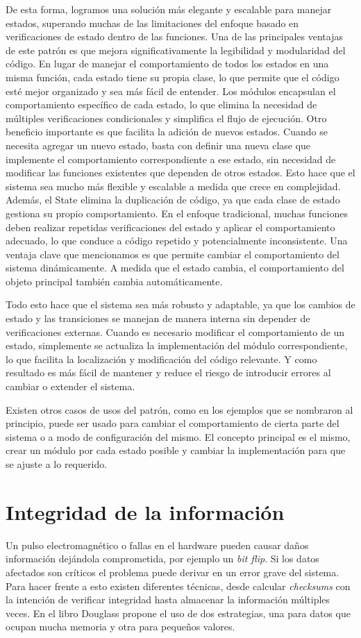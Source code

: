 De esta forma, logramos una solución más elegante y escalable para manejar estados, superando muchas de las limitaciones del enfoque basado en verificaciones de estado dentro de las funciones. Una de las principales ventajas de este patrón es que mejora significativamente la legibilidad y modularidad del código. En lugar de manejar el comportamiento de todos los estados en una misma función, cada estado tiene su propia clase, lo que permite que el código esté mejor organizado y sea más fácil de entender. Los módulos encapsulan el comportamiento específico de cada estado, lo que elimina la necesidad de múltiples verificaciones condicionales y simplifica el flujo de ejecución. Otro beneficio importante es que facilita la adición de nuevos estados. Cuando se necesita agregar un nuevo estado, basta con definir una nueva clase que implemente el comportamiento correspondiente a ese estado, sin necesidad de modificar las funciones existentes que dependen de otros estados. Esto hace que el sistema sea mucho más flexible y escalable a medida que crece en complejidad. Además, el State elimina la duplicación de código, ya que cada clase de estado gestiona su propio comportamiento. En el enfoque tradicional, muchas funciones deben realizar repetidas verificaciones del estado y aplicar el comportamiento adecuado, lo que conduce a código repetido y potencialmente inconsistente. Una ventaja clave que mencionamos es que permite cambiar el comportamiento del sistema dinámicamente. A medida que el estado cambia, el comportamiento del objeto principal también cambia automáticamente. 

Todo esto hace que el sistema sea más robusto y adaptable, ya que los cambios de estado y las transiciones se manejan de manera interna sin depender de verificaciones externas. Cuando es necesario modificar el comportamiento de un estado, simplemente se actualiza la implementación del módulo correspondiente, lo que facilita la localización y modificación del código relevante. Y como resultado es más fácil de mantener y reduce el riesgo de introducir errores al cambiar o extender el sistema.

Existen otros casos de usos del patrón, como en los ejemplos que se nombraron al principio, puede ser usado para cambiar el comportamiento de cierta parte del sistema o a modo de configuración del mismo. El concepto principal es el mismo, crear un módulo por cada estado posible y cambiar la implementación para que se ajuste a lo requerido.

\section{Integridad de la información}
Un pulso electromagnético o fallas en el hardware pueden causar daños información dejándola comprometida, por ejemplo un \textit{bit flip}. Si los datos afectados son críticos el problema puede derivar en un error grave del sistema. Para hacer frente a esto existen diferentes técnicas, desde calcular \textit{checksums} con la intención de verificar integridad hasta almacenar la información múltiples veces. En el libro Douglass propone el uso de dos estrategias, una para datos que ocupan mucha memoria y otra para pequeños valores.

